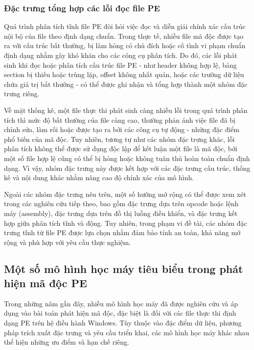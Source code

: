 \subsubsection{Đặc trưng tổng hợp các lỗi đọc file PE}

Quá trình phân tích tĩnh file PE đòi hỏi việc đọc và diễn giải chính
xác cấu trúc nội bộ của file theo định dạng chuẩn. Trong thực tế,
nhiều file mã độc được tạo ra với cấu trúc bất thường, bị làm hỏng có
chủ đích hoặc cố tình vi phạm chuẩn định dạng nhằm gây khó khăn cho
các công cụ phân tích. Do đó, các lỗi phát sinh khi đọc hoặc phân
tích cấu trúc file PE - như header không hợp lệ, bảng section bị
thiếu hoặc trùng lặp, offset không nhất quán, hoặc các trường dữ liệu
chứa giá trị bất thường - có thể được ghi nhận và tổng hợp thành
một nhóm đặc trưng riêng.

Về mặt thống kê, một file thực thi phát sinh càng nhiều lỗi trong quá
trình phân tích thì mức độ bất thường của file càng cao, thường phản
ánh việc file đã bị chỉnh sửa, làm rối hoặc được tạo ra bởi các công
cụ tự động - những đặc điểm phổ biến của mã độc. Tuy nhiên, tương
tự như các nhóm đặc trưng khác, lỗi phân tích không thể được sử dụng
độc lập để kết luận một file là mã độc, bởi một số file hợp lệ cũng
có thể bị hỏng hoặc không tuân thủ hoàn toàn chuẩn định dạng. Vì vậy,
nhóm đặc trưng này được kết hợp với các đặc trưng cấu trúc, thống kê
và nội dung khác nhằm nâng cao độ chính xác của mô hình.

Ngoài các nhóm đặc trưng nêu trên, một số hướng mở rộng có thể được
xem xét trong các nghiên cứu tiếp theo, bao gồm đặc trưng dựa trên
opcode hoặc lệnh máy (assembly), đặc trưng dựa trên đồ thị luồng điều
khiển, và đặc trưng kết hợp giữa phân tích tĩnh và động. Tuy nhiên,
trong phạm vi đề tài, các nhóm đặc trưng tĩnh từ file PE được lựa
chọn nhằm đảm bảo tính an toàn, khả năng mở rộng và phù hợp với yêu
cầu thực nghiệm.

\subsection{Một số mô hình học máy tiêu biểu trong phát hiện mã độc PE}

Trong những năm gần đây, nhiều mô hình học máy đã được nghiên cứu và
áp dụng vào bài toán phát hiện mã độc, đặc biệt là đối với các file
thực thi định dạng PE trên hệ điều hành Windows. Tùy thuộc vào đặc
điểm dữ liệu, phương pháp trích xuất đặc trưng và yêu cầu triển khai,
các mô hình học máy khác nhau thể hiện những ưu điểm và hạn chế riêng.

